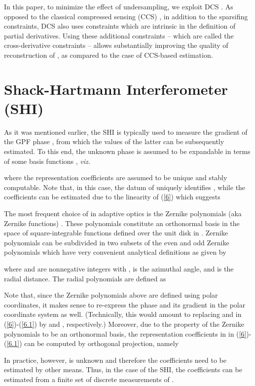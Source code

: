 \pdfoutput=1 \documentclass[journal]{IEEEtran}
\begin{document}
In this paper, to minimize the effect of undersampling, we exploit DCS \cite{14}. As opposed to the classical compressed sensing (CCS) \cite{13}, in addition to the sparsifing constraints, DCS also uses constraints which are intrinsic in the definition of partial derivatives. Using these additional constraints -- which are called the cross-derivative constraints -- allows substantially improving the quality of reconstruction of , as compared to the case of CCS-based estimation.

\section{Shack-Hartmann Interferometer (SHI)}
As it was mentioned earlier, the SHI is typically used to measure the gradient  of the GPF phase , from which the values of the latter can be subsequently estimated. To this end, the unknown phase  is assumed to be expandable in terms of some basis functions , {\it viz.} \cite{18}

where the representation coefficients  are assumed to be unique and stably computable. Note that, in this case, the datum of  uniquely identifies , while the coefficients  can be estimated due to the linearity of (\ref{6}) which suggests


The most frequent choice of  in adaptive optics is the Zernike polynomials (aka Zernike functions) \cite{17}. These polynomials constitute an orthonormal basis in the space of square-integrable functions defined over the unit disk in . Zernike polynomials can be subdivided in two subsets of the even  and odd  Zernike polynomials which have very convenient analytical definitions as given by

where  and  are nonnegative integers with ,  is the azimuthal angle, and  is the radial distance. The radial polynomials  are defined as


Note that, since the Zernike polynomials above are defined using polar coordinates, it makes sense to re-express the phase  and its gradient in the polar coordinate system as well. (Technically, this would amount to replacing  and  in (\ref{6})-(\ref{6.1}) by  and , respectively.) Moreover, due to the property of the Zernike polynomials to be an orthonormal basis, the representation coefficients  in in (\ref{6})-(\ref{6.1}) can be computed by orthogonal projection, namely

In practice, however,  is unknown and therefore the coefficients  need to be estimated by other means. Thus, in the case of the SHI, the coefficients can be estimated from a finite set of discrete measurements of .
\end{document}
